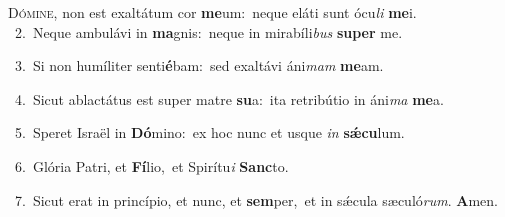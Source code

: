 \lettrine{\initial\textcolor{\initialcolor}{D}}{ómine,} non est exaltátum cor \textbf{me}\-um:~\star neque eláti sunt ócu\textit{li} \textbf{me}\-i.\\
{\numbfont\textcolor{\numbcolor}{~2.}}~Neque ambulávi in \textbf{ma}\-gnis:~\star neque in mirabíli\textit{bus} \textbf{su}\-\textbf{per} me.\par
{\numbfont\textcolor{\numbcolor}{~3.}}~Si non humíliter senti\-\textbf{é}\-bam:~\star sed exaltávi áni\textit{mam} \textbf{me}\-am.\par
{\numbfont\textcolor{\numbcolor}{~4.}}~Sicut ablactátus est super matre \textbf{su}\-a:~\star ita retribútio in áni\textit{ma} \textbf{me}\-a.\par
{\numbfont\textcolor{\numbcolor}{~5.}}~Speret Israël in \textbf{Dó}\-mino:~\star ex hoc nunc et usque \textit{in} \textbf{sǽ}\-\textbf{cu}lum.\par
{\numbfont\textcolor{\numbcolor}{~6.}}~Glória Patri, et \textbf{Fí}\-lio,~\star et Spirítu\textit{i} \textbf{Sanc}\-to.\par
{\numbfont\textcolor{\numbcolor}{~7.}}~Sicut erat in princípio, et nunc, et \textbf{sem}\-per,~\star et in sǽcula sæculó\-\textit{rum}\-. \textbf{A}\-men.\par
